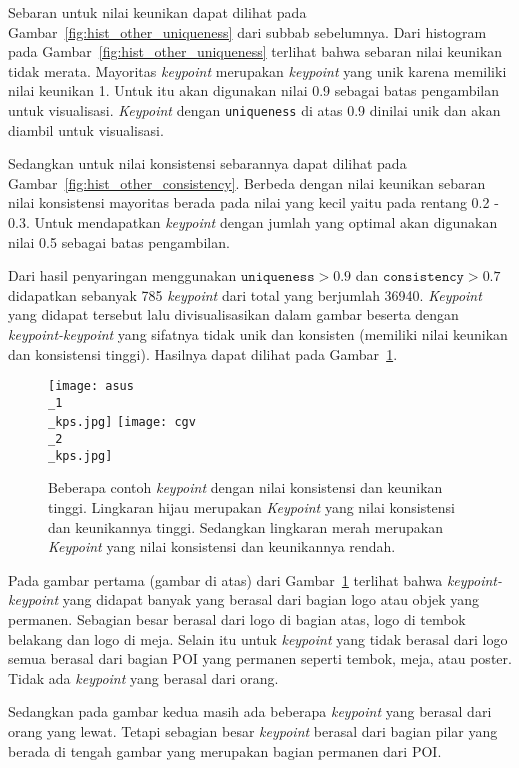 Sebaran untuk nilai keunikan dapat dilihat pada Gambar~\ref{fig:hist_other_uniqueness} dari subbab sebelumnya. Dari histogram pada Gambar~\ref{fig:hist_other_uniqueness} terlihat bahwa sebaran nilai keunikan tidak merata. Mayoritas \textit{keypoint} merupakan \textit{keypoint} yang unik karena memiliki nilai keunikan 1. Untuk itu akan digunakan nilai 0.9 sebagai batas pengambilan untuk visualisasi. \textit{Keypoint} dengan \texttt{uniqueness} di atas 0.9 dinilai unik dan akan diambil untuk visualisasi.

Sedangkan untuk nilai konsistensi sebarannya dapat dilihat pada Gambar~\ref{fig:hist_other_consistency}. Berbeda dengan nilai keunikan sebaran nilai konsistensi mayoritas berada pada nilai yang kecil yaitu pada rentang 0.2 - 0.3. Untuk mendapatkan \textit{keypoint} dengan jumlah yang optimal akan digunakan nilai 0.5 sebagai batas pengambilan. 

Dari hasil penyaringan menggunakan $\mathtt{uniqueness} > 0.9$ dan $\mathtt{consistency} > 0.7$ didapatkan sebanyak 785 \textit{keypoint} dari total yang berjumlah 36940. \textit{Keypoint} yang didapat tersebut lalu divisualisasikan dalam gambar beserta dengan \textit{keypoint-keypoint} yang sifatnya tidak unik dan konsisten (memiliki nilai keunikan dan konsistensi tinggi). Hasilnya dapat dilihat pada Gambar~\ref{fig:other_filtered_keypoints}.
\begin{figure}[H]
	\centering
	\texttt{[image: asus\\\_1\\\_kps.jpg]}
	\texttt{[image: cgv\\\_2\\\_kps.jpg]}
	\caption{Beberapa contoh \textit{keypoint} dengan nilai konsistensi dan keunikan tinggi. Lingkaran hijau merupakan \textit{Keypoint} yang nilai konsistensi dan keunikannya tinggi. Sedangkan lingkaran merah merupakan \textit{Keypoint} yang nilai konsistensi dan keunikannya rendah.}
	\label{fig:other_filtered_keypoints}
\end{figure}

Pada gambar pertama (gambar di atas) dari Gambar~\ref{fig:other_filtered_keypoints} terlihat bahwa \textit{keypoint-keypoint} yang didapat banyak yang berasal dari bagian logo atau objek yang permanen. Sebagian besar berasal dari logo di bagian atas, logo di tembok belakang dan logo di meja. Selain itu untuk \textit{keypoint} yang tidak berasal dari logo semua berasal dari bagian POI yang permanen seperti tembok, meja, atau poster. Tidak ada \textit{keypoint} yang berasal dari orang.

Sedangkan pada gambar kedua masih ada beberapa \textit{keypoint} yang berasal dari orang yang lewat. Tetapi sebagian besar \textit{keypoint} berasal dari bagian pilar yang berada di tengah gambar yang merupakan bagian permanen dari POI.

